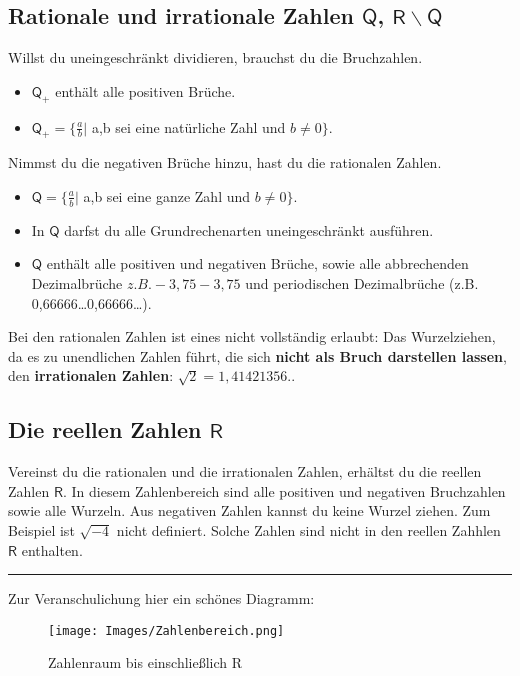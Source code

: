 \documentclass{scrreprt}
\begin{document}
\subsection{Rationale und irrationale Zahlen $\mathsf{Q}$, $\mathsf{R \backslash Q}$}\label{Rationale und irrationale Zahlen}
Willst du uneingeschränkt dividieren, brauchst du die Bruchzahlen.
\begin{itemize}
    \item $\mathsf{Q}_+$ enthält alle positiven Brüche.
    \item $\mathsf{Q}_+ = \{\frac{a}{b} \vert$ a,b sei eine natürliche Zahl und $b \neq 0\}$.
\end{itemize} 
Nimmst du die negativen Brüche hinzu, hast du die rationalen Zahlen.
\begin{itemize}
    \item $\mathsf{Q} = \{\frac{a}{b} \vert$ a,b sei eine ganze Zahl und $b \neq 0\}$.
    \item In $\mathsf{Q}$ darfst du alle Grundrechenarten uneingeschränkt ausführen.
    \item $\mathsf{Q}$ enthält alle positiven und negativen Brüche, sowie alle abbrechenden Dezimalbrüche \(z.B. -3,75-3,75\) und periodischen Dezimalbrüche (z.B. 0,66666…0,66666…).
\end{itemize}
Bei den rationalen Zahlen ist eines nicht vollständig erlaubt: Das Wurzelziehen, da es zu unendlichen Zahlen führt, die sich \textbf{nicht als Bruch darstellen lassen}, den \textbf{irrationalen Zahlen}:
$\sqrt{2}=1,41421356..$ 
\subsection{Die reellen Zahlen $\mathsf{R}$}\label{Die reellen Zahlen}
Vereinst du die rationalen und die irrationalen Zahlen, erhältst du die reellen Zahlen $\mathsf{R}$. In diesem Zahlenbereich sind alle positiven und negativen Bruchzahlen sowie alle Wurzeln. Aus negativen Zahlen kannst du keine Wurzel ziehen. Zum Beispiel ist $\sqrt{-4}$ nicht definiert. Solche Zahlen sind nicht in den reellen Zahhlen $\mathsf{R}$ enthalten. \hfill\break
\hrule
\hfill \break
Zur Veranschulichung hier ein schönes Diagramm: 
\begin{figure}[h]
    \centering
    \texttt{[image: Images/Zahlenbereich.png]}
    \caption{Zahlenraum bis einschließlich R}
    \label{Figur 1}
\end{figure}
\end{document}
